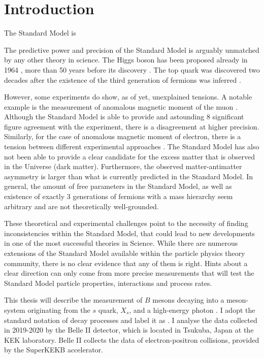\chapter{Introduction}

The Standard Model is 

The predictive power and precision of the Standard Model is arguably unmatched by any other theory in science.
The Higgs boson has been proposed already in 1964 \cite{PhysRevLett.13.508}, more than 50 years before its discovery \cite{ATLAS:2012yve,CMS:2012qbp}.
The top quark was discovered \cite{PhysRevLett.74.2632,PhysRevLett.74.2626} two decades after the existence of the third generation of fermions was inferred \cite{HARARI1975265}.

However, some experiments do show, as of yet, unexplained tensions. 
A notable example is the measurement of anomalous magnetic moment of the muon \cite{PhysRevLett.126.141801}.
Although the Standard Model is able to provide and astounding 8 significant figure agreement with the experiment, there is a disagreement at higher precision.
Similarly, for the case of anomalous magnetic moment of electron, there is a tension between different experimental approaches \cite{PhysRevLett.100.120801,Morel:2020dww,Li:2021koa}.
The Standard Model has also not been able to provide a clear candidate for the excess matter that is observed in the Universe (dark matter).
Furthermore, the observed matter-antimatter asymmetry is larger than what is currently predicted in the Standard Model.
In general, the amount of free parameters in the Standard Model, as well as existence of exactly 3 generations of fermions with a mass hierarchy seem arbitrary and are not theoretically well-grounded.

These theoretical and experimental challenges point to the necessity of finding inconsistencies within the Standard Model, that could lead to new developments in one of the most successful theories in Science.
While there are numerous extensions of the Standard Model available within the particle physics theory community, there is no clear evidence that any of them is right.
Hints about a clear direction can only come from more precise measurements that will test the Standard Model particle properties, interactions and process rates.

This thesis will describe the measurement of $B$ mesons decaying into a meson-system originating from the $s$ quark, $X_s$, and a high-energy photon \g.
I adopt the standard notation of decay processes and label it as \BtoXsgamma.
I analyse the data collected in 2019-2020 by the Belle II detector, which is located in Tsukuba, Japan at the KEK laboratory.
Belle II collects the data of electron-positron collisions, provided by the SuperKEKB accelerator.


